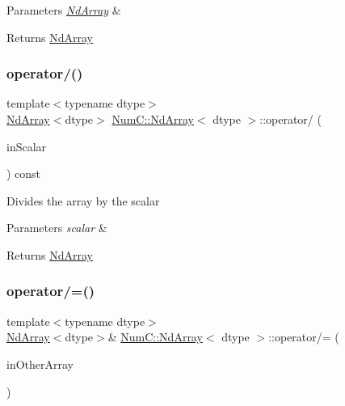 \begin{DoxyParams}{Parameters}
{\em \mbox{\hyperlink{class_num_c_1_1_nd_array}{Nd\+Array}}} & \\
\hline
\end{DoxyParams}
\begin{DoxyReturn}{Returns}
\mbox{\hyperlink{class_num_c_1_1_nd_array}{Nd\+Array}} 
\end{DoxyReturn}
\mbox{\label{class_num_c_1_1_nd_array_ae650e8fc96a390cc8e1d159c45c5fd1a}} 
\subsubsection{\texorpdfstring{operator/()}{operator/()}\hspace{0.1cm}{\footnotesize\ttfamily [2/2]}}
{\footnotesize\ttfamily template$<$typename dtype$>$ \\
\mbox{\hyperlink{class_num_c_1_1_nd_array}{Nd\+Array}}$<$dtype$>$ \mbox{\hyperlink{class_num_c_1_1_nd_array}{Num\+C\+::\+Nd\+Array}}$<$ dtype $>$\+::operator/ (\begin{DoxyParamCaption}\item[{dtype}]{in\+Scalar }\end{DoxyParamCaption}) const\hspace{0.3cm}{\ttfamily [inline]}}

Divides the array by the scalar


\begin{DoxyParams}{Parameters}
{\em scalar} & \\
\hline
\end{DoxyParams}
\begin{DoxyReturn}{Returns}
\mbox{\hyperlink{class_num_c_1_1_nd_array}{Nd\+Array}} 
\end{DoxyReturn}
\mbox{\label{class_num_c_1_1_nd_array_af9950420762002d301c396e1d5ab0858}} 
\subsubsection{\texorpdfstring{operator/=()}{operator/=()}\hspace{0.1cm}{\footnotesize\ttfamily [1/2]}}
{\footnotesize\ttfamily template$<$typename dtype$>$ \\
\mbox{\hyperlink{class_num_c_1_1_nd_array}{Nd\+Array}}$<$dtype$>$\& \mbox{\hyperlink{class_num_c_1_1_nd_array}{Num\+C\+::\+Nd\+Array}}$<$ dtype $>$\+::operator/= (\begin{DoxyParamCaption}\item[{const \mbox{\hyperlink{class_num_c_1_1_nd_array}{Nd\+Array}}$<$ dtype $>$ \&}]{in\+Other\+Array }\end{DoxyParamCaption})\hspace{0.3cm}{\ttfamily [inline]}}

